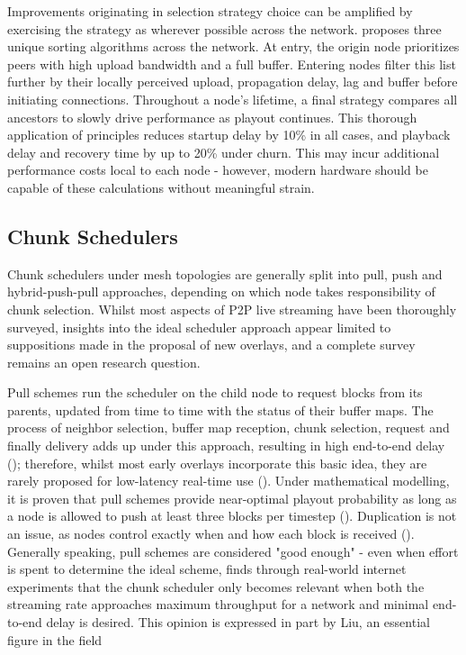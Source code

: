 \documentclass[12pt,a4paper]{article}
\begin{document}
Improvements originating in selection strategy choice can be amplified by exercising the strategy as wherever possible across the network. \cite{Budhkar2017} proposes three unique sorting algorithms across the network. At entry, the origin node prioritizes peers with high upload bandwidth and a full buffer. Entering nodes filter this list further by their locally perceived upload, propagation delay, lag and buffer before initiating connections. Throughout a node's lifetime, a final strategy compares all ancestors to slowly drive performance as playout continues. This thorough application of principles reduces startup delay by 10\% in all cases, and playback delay and recovery time by up to 20\% under churn. This may incur additional performance costs local to each node - however, modern hardware should be capable of these calculations without meaningful strain.

\subsection{Chunk Schedulers} \label{litreview:schedulers}
Chunk schedulers under mesh topologies are generally split into pull, push and hybrid-push-pull approaches, depending on which node takes responsibility of chunk selection. Whilst most aspects of P2P live streaming have been thoroughly surveyed, insights into the ideal scheduler approach appear limited to suppositions made in the proposal of new overlays, and a complete survey remains an open research question.

Pull schemes run the scheduler on the child node to request blocks from its parents, updated from time to time with the status of their buffer maps. The process of neighbor selection, buffer map reception, chunk selection, request and finally delivery adds up under this approach, resulting in high end-to-end delay (\cite{Hei2008a}); therefore, whilst most early overlays incorporate this basic idea, they are rarely proposed for low-latency real-time use (\cite{Zhang2007}). Under mathematical modelling, it is proven that pull schemes provide near-optimal playout probability as long as a node is allowed to push at least three blocks per timestep (\cite{Zhang2014}). Duplication is not an issue, as nodes control exactly when and how each block is received (\cite{LoCigno2008}). Generally speaking, pull schemes are considered "good enough" - even when effort is spent to determine the ideal scheme, \cite{Liang2009} finds through real-world internet experiments that the chunk scheduler only becomes relevant when both the streaming rate approaches maximum throughput for a network and minimal end-to-end delay is desired. This opinion is expressed in part by Liu, an essential figure in the field 
\end{document}
